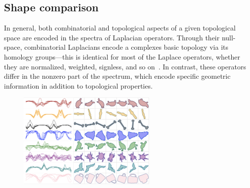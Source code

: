 \documentclass[10pt]{article}
\numberwithin{equation}{section}
\newcommand{\+}{%
	\raisebox{0.18ex}{\scaleobj{0.55}{+}}
}
\theoremstyle{definition}
\theoremstyle{definition}
\begin{document}



%

\subsection*{Shape comparison}
In general, both combinatorial and topological aspects of a given topological space are encoded in the spectra of Laplacian operators. 
Through their null-space, combinatorial Laplacians encode a complexes basic topology via its homology groups---this is identical for most of the Laplace operators, whether they are normalized, weighted, signless, and so on~\cite{}.
In contrast, these operators differ in the nonzero part of the spectrum, which encode specific geometric information in addition to topological properties. 

 
\begin{figure}
	\centering
	\includegraphics[width=0.6\textwidth]{shape_signatures}
\end{figure}
\end{document}
